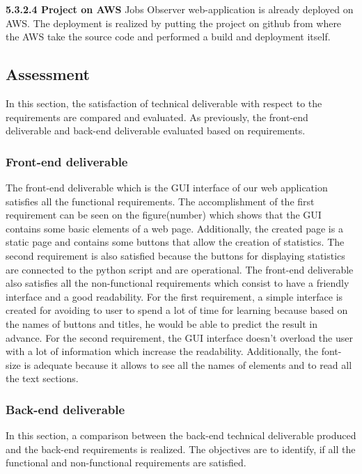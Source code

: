 \documentclass[conference,compsoc]{IEEEtran}
\begin{document}
\noindent
\newline\newline
\textbf{5.3.2.4 Project on AWS}
\newline\newline
Jobs Observer web-application is already deployed on AWS. The deployment is realized by putting the project on github from where the AWS take the source code and performed a build and deployment itself. 

\subsection{Assessment}
In this section, the satisfaction of technical deliverable with respect to the requirements are compared and evaluated. As previously, the front-end deliverable and back-end deliverable evaluated based on requirements. 

\subsubsection{Front-end deliverable}
The front-end deliverable which is the GUI interface of our web application satisfies all the functional requirements. The accomplishment of the first requirement can be seen on the figure(number) which shows that the GUI contains some basic elements of a web page. Additionally, the created page is a static page and contains some buttons that allow the creation of statistics.                                         
\newline
The second requirement is also satisfied because the buttons for displaying statistics are connected to the python script and are operational. 
The front-end deliverable also satisfies all the non-functional requirements which consist to have a friendly interface and a good readability. For the first requirement, a simple interface is created for avoiding to user to spend a lot of time for learning because based on the names of buttons and titles, he would be able to predict the result in advance.
\newline                                                                                                     
For the second requirement, the GUI interface doesn't overload the user with a lot of information which increase the readability. Additionally, the font-size is adequate because it allows to see all the names of elements and to read all the text sections. 


\subsubsection{Back-end deliverable}
In this section, a comparison between the back-end technical deliverable produced and the back-end requirements is realized. The objectives are to identify, if all the functional and non-functional requirements are satisfied. 
\end{document}
